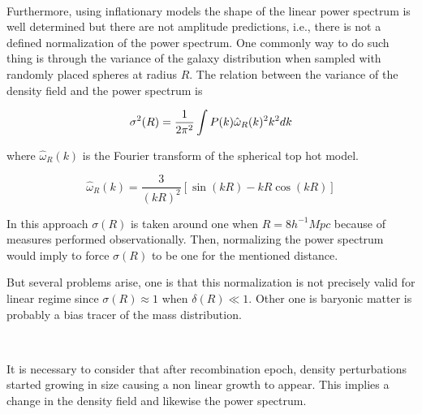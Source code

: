 \

Furthermore, using inflationary models the shape of the linear power spectrum is well 
determined but there are not amplitude predictions, i.e., there is not a defined 
normalization of the power spectrum. 
One commonly way to do such thing is through the variance of the galaxy distribution when
sampled with randomly placed spheres at radius $R$. The relation between the variance of the 
density field and the power spectrum is

\[
\sigma^2(R) = \frac{1}{2\pi^2} \int P(k)\hat{\omega}_R(k)^2k^2 dk
\]

where $\hat{\omega}_R(k)$ is the Fourier transform of the spherical top hot model.

\[\hat{\omega}_R(k) = \frac{3}{(k R)^2}[\sin(kR)-kR\cos(k R)]\]
 
In this approach $\sigma(R)$ is taken around one when $R=8h^{-1}Mpc$ because of 
measures performed observationally. 
Then, normalizing the power spectrum would imply to force $\sigma(R)$ to be one 
for the mentioned distance.

But several problems arise, one is that this normalization is not precisely valid
for linear regime since $\sigma(R)\approx 1$ when $\delta(R)\ll 1$. Other one is
baryonic matter is probably a bias tracer of the mass distribution. 

\

It is necessary to consider that after recombination epoch, density perturbations started
growing in size causing a non linear growth to appear. This implies a change in the 
density field and likewise the power spectrum. 






